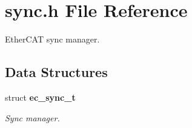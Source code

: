\section{sync.\-h File Reference}
\label{sync_8h}


Ether\-C\-A\-T sync manager.  


\subsection*{Data Structures}
\begin{DoxyCompactItemize}
\item 
struct {\bf ec\-\_\-sync\-\_\-t}
\begin{DoxyCompactList}\small\item\em Sync manager. \end{DoxyCompactList}\end{DoxyCompactItemize}
